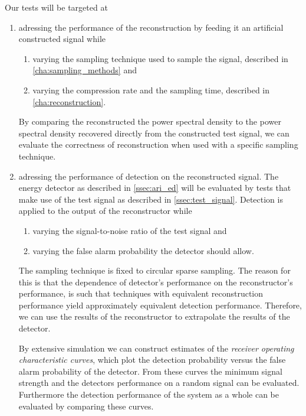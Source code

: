 \documentclass[a4paper, openany, oneside]{memoir}
\begin{document}
Our tests will be targeted at
\begin{enumerate}
	\item adressing the performance of the reconstruction by feeding it an artificial constructed signal while
	\begin{enumerate}
		\item varying the sampling technique used to sample the signal, described in \cref{cha:sampling_methods} and
		\item varying the compression rate and the sampling time, described in \cref{cha:reconstruction}.
	\end{enumerate}
	By comparing the reconstructed the power spectral density to the power spectral density recovered directly from the constructed test signal, we can evaluate the correctness of reconstruction when used with a specific sampling technique.
	\item adressing the performance of detection on the reconstructed signal. The energy detector as described in \cref{ssec:ari_ed} will be evaluated by tests that make use of the test signal as described in \cref{ssec:test_signal}. 
	Detection is applied to the output of the reconstructor while	
	\begin{enumerate}
		\item varying the signal-to-noise ratio of the test signal and
		\item varying the false alarm probability the detector 
		should allow.
	\end{enumerate}

	The sampling technique is fixed to circular sparse sampling. The reason for this is that the dependence of detector's performance on the reconstructor's performance, is such that techniques with equivalent reconstruction performance yield approximately equivalent detection performance. Therefore, we can use the results of the reconstructor to extrapolate the results of the detector.

	By extensive simulation we can construct estimates of the \emph{receiver operating characteristic curves}, which plot the detection probability versus the false alarm probability of the detector. From these curves the minimum signal strength and the detectors performance on a random signal can be evaluated. Furthermore the detection performance of the system as a whole can be evaluated by comparing these curves.
	\end{enumerate}
\end{document}
